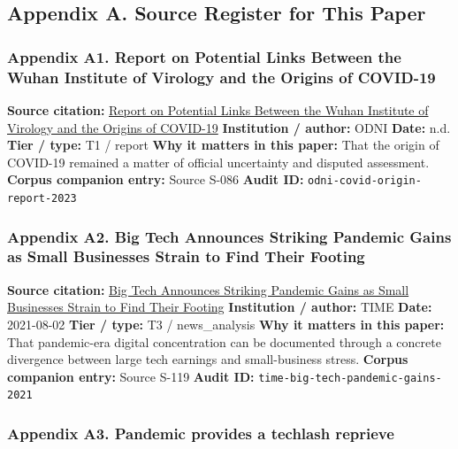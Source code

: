 \documentclass[
  american,
  11pt,
  letterpaper,
]{article}
\begin{document}
\subsection{Appendix A. Source Register for This
Paper}\label{appendix-a.-source-register-for-this-paper}

\subsubsection{Appendix A1. Report on Potential Links Between the Wuhan
Institute of Virology and the Origins of
COVID-19}\label{appendix-a1-report-on-potential-links-between-the-wuhan-institute-of-virology-and-the-origins-of-covid-19}

\textbf{Source citation:}
\href{https://www.dni.gov/files/ODNI/documents/assessments/Report-on-Potential-Links-Between-the-Wuhan-Institute-of-Virology-and-the-Origins-of-COVID-19-20230623.pdf}{Report
on Potential Links Between the Wuhan Institute of Virology and the
Origins of COVID-19} \textbf{Institution / author:} ODNI \textbf{Date:}
n.d. \textbf{Tier / type:} T1 / report \textbf{Why it matters in this
paper:} That the origin of COVID-19 remained a matter of official
uncertainty and disputed assessment. \textbf{Corpus companion entry:}
Source S-086 \textbf{Audit ID:} \texttt{odni-covid-origin-report-2023}

\subsubsection{Appendix A2. Big Tech Announces Striking Pandemic Gains
as Small Businesses Strain to Find Their
Footing}\label{appendix-a2-big-tech-announces-striking-pandemic-gains-as-small-businesses-strain-to-find-their-footing}

\textbf{Source citation:}
\href{https://time.com/6085674/big-tech-apple-microsoft-facebook-amazon-google-earnings/}{Big
Tech Announces Striking Pandemic Gains as Small Businesses Strain to
Find Their Footing} \textbf{Institution / author:} TIME \textbf{Date:}
2021-08-02 \textbf{Tier / type:} T3 / news\_analysis \textbf{Why it
matters in this paper:} That pandemic-era digital concentration can be
documented through a concrete divergence between large tech earnings and
small-business stress. \textbf{Corpus companion entry:} Source S-119
\textbf{Audit ID:} \texttt{time-big-tech-pandemic-gains-2021}

\subsubsection{Appendix A3. Pandemic provides a techlash
reprieve}\label{appendix-a3-pandemic-provides-a-techlash-reprieve}
\end{document}
